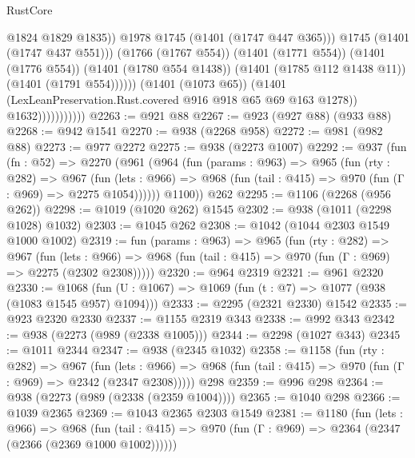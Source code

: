 \begin{lexlean}{RustCore}
\begin{coremodule}
                                          @1824
                                          @1829
                                          @1835))
                                      @1978
                                      @1745
                                      (@1401 (@1747 @447 @365)))
                                    @1745
                                    (@1401 (@1747 @437 @551)))
                                  (@1766 (@1767 @554))
                                  (@1401 (@1771 @554))
                                  (@1401 (@1776 @554))
                                  (@1401 (@1780 @554 @1438))
                                  (@1401 (@1785 @112 @1438 @11))
                                  (@1401 (@1791 @554))))))
                          (@1401 (@1073 @65))
                          (@1401 (LexLeanPreservation.Rust.covered @916 @918 @65 @69 @163 @1278))
                          @1632)))))))))))
@2263 := @921 @88
@2267 := @923 (@927 @88) (@933 @88)
@2268 := @942 @1541
@2270 := @938 (@2268 @958)
@2272 := @981 (@982 @88)
@2273 := @977 @2272
@2275 := @938 (@2273 @1007)
@2292 := @937
    (fun (fn : @52) =>
    @2270
      (@961
        (@964
          (fun (params : @963) =>
          @965
            (fun (rty : @282) =>
            @967
              (fun (lets : @966) =>
              @968 (fun (tail : @415) => @970 (fun (Γ : @969) => @2275 @1054))))))
        @1100))
    @262
@2295 := @1106 (@2268 (@956 @262))
@2298 := @1019 (@1020 @262) @1545
@2302 := @938 (@1011 (@2298 @1028) @1032)
@2303 := @1045 @262
@2308 := @1042 (@1044 @2303 @1549 @1000 @1002)
@2319 := fun (params : @963) =>
  @965
    (fun (rty : @282) =>
    @967
      (fun (lets : @966) =>
      @968 (fun (tail : @415) => @970 (fun (Γ : @969) => @2275 (@2302 @2308)))))
@2320 := @964 @2319
@2321 := @961 @2320
@2330 := @1068 (fun (U : @1067) => @1069 (fun (t : @7) => @1077 (@938 (@1083 @1545 @957) @1094)))
@2333 := @2295 (@2321 @2330) @1542
@2335 := @923 @2320 @2330
@2337 := @1155 @2319 @343
@2338 := @992 @343
@2342 := @938 (@2273 (@989 (@2338 @1005)))
@2344 := @2298 (@1027 @343)
@2345 := @1011 @2344
@2347 := @938 (@2345 @1032)
@2358 := @1158
    (fun (rty : @282) =>
    @967
      (fun (lets : @966) =>
      @968 (fun (tail : @415) => @970 (fun (Γ : @969) => @2342 (@2347 @2308)))))
    @298
@2359 := @996 @298
@2364 := @938 (@2273 (@989 (@2338 (@2359 @1004))))
@2365 := @1040 @298
@2366 := @1039 @2365
@2369 := @1043 @2365 @2303 @1549
@2381 := @1180
    (fun (lets : @966) =>
    @968 (fun (tail : @415) => @970 (fun (Γ : @969) => @2364 (@2347 (@2366 (@2369 @1000 @1002))))))

\end{coremodule}
\end{lexlean}
